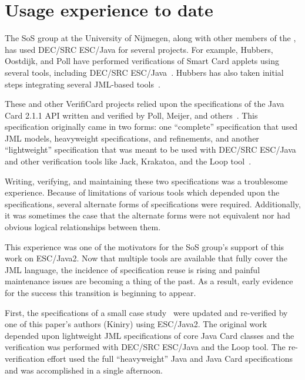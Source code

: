 \documentclass{sig-alternate}
\begin{document}
\section{Usage experience to date}
\label{sec:usage-exper-date}
The SoS group at the University of Nijmegen, along with other members
of the , has used DEC/SRC ESC/Java for several projects.  For
example, Hubbers, Oostdijk, and Poll have performed verifications of
Smart Card applets using several tools, including DEC/SRC
ESC/Java~\cite{HOP04}.  Hubbers has also taken initial steps
integrating several JML-based tools~\cite{Hub03}.

These and other VerifiCard projects relied upon the specifications of
the Java Card 2.1.1 API written and verified by Poll, Meijer, and
others~\cite{MeijerPoll01}.  This specification originally came in two
forms: one ``complete'' specification that used JML models,
heavyweight specifications, and refinements, and another
``lightweight'' specification that was meant to be used with DEC/SRC
ESC/Java and other verification tools like Jack, Krakatoa, and the
Loop tool~\cite{BergJ01,BurdyRequet02,MarchePaulinMohringUrbain04}.

Writing, verifying, and maintaining these two specifications was a
troublesome experience.  Because of limitations of various tools which
depended upon the specifications, several alternate forms of
specifications were required.  Additionally, it was sometimes the case
that the alternate forms were not equivalent nor had obvious logical
relationships between them.


This experience was one of the motivators for the SoS group's support
of this work on ESC/Java2.  Now that multiple tools are available that
fully cover the JML language, the incidence of specification reuse is
rising and painful maintenance issues are becoming a thing of the
past.  As a result, early evidence for the success this transition is
beginning to appear.

First, the specifications of a small case
study~\cite{BreunesseJacobsBerg02} were updated and re-verified by one
of this paper's authors (Kiniry) using ESC/Java2.  The original work
depended upon light\-weight JML specifications of core Java Card classes
and the verification was performed with DEC/SRC ESC/Java and the Loop
tool.  The re-verification effort used the full ``heavyweight'' Java
and Java Card specifications and was accomplished in a single
afternoon.
\end{document}
